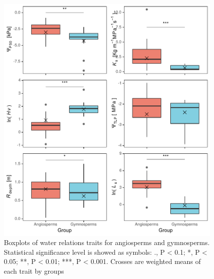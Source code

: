 \documentclass[11pt,twoside]{reedthesis}
\begin{document}
\begin{figure}[H]

{\centering \includegraphics[width=1\linewidth]{figure/appendixD/figanggym} 

}

\caption{Boxplots of water relations traits for angiosperms and gymnosperms. Statistical significance level is showed as symbols: ., P < 0.1; *, P < 0.05; **, P < 0.01; ***, P < 0.001. Crosses are weighted means of each trait by groups}\label{fig:angiogymnoplotsAOVplot}
\end{figure}
\newpage
\end{document}

